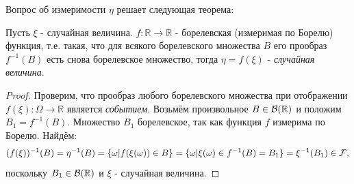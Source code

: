 \begin{figure}[H]
\end{figure}

Вопрос об измеримости $\eta$ решает следующая теорема:

\begin{theorem}
	Пусть $\xi$ - случайная величина.
	\noindent $f: \mathbb{R} \to \mathbb{R}$ - борелевская (измеримая по Борелю) функция, т.е. такая, что для всякого борелевского множества $B$ его прообраз $f^{-1} (B)$ есть снова борелевское множество, тогда $\eta = f (\xi)$ - \textit{случайная величина}.
	\begin{proof}
		Проверим, что прообраз любого борелевского множества при отображении $f(\xi): \Omega \to \mathbb{R}$ является \textit{событием}. Возьмём произвольное $B \in {\mathcal{B}} (\mathbb{R})$ и положим $B_1 = f^{-1} (B)$. Множество $B_1$ борелевское, так как функция $f$ измерима по Борелю. Найдём:
		\[ ( f(\xi) )^{-1} (B) = \eta^{-1} (B) = \{ \omega | f (\xi(\omega)) \in B \} = \{ \omega | \xi (\omega) \in f^{-1} (B) = B_1 \} = \xi^{-1} (B_1) \in {\mathcal F}, \]
		поскольку $B_1 \in {\mathcal{B}} (\mathbb{R})$ и $\xi$ - случайная величина.
	\end{proof}
\end{theorem}

